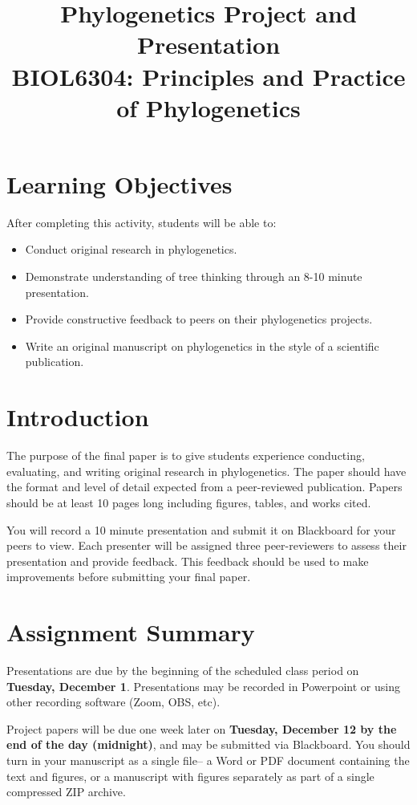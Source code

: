 \documentclass[12pt]{article}
\title{Phylogenetics Project and Presentation\\ \large BIOL6304: Principles and Practice of Phylogenetics }
\begin{document}
\maketitle

\section{Learning Objectives}

After completing this activity, students will be able to:

\begin{itemize}
\item Conduct original research in phylogenetics.
\item Demonstrate understanding of tree thinking through an 8-10 minute presentation.
\item Provide constructive feedback to peers on their phylogenetics projects.
\item Write an original manuscript on phylogenetics in the style of a scientific publication.
\end{itemize}

\section{Introduction}

The purpose of the final paper is to give students experience conducting, evaluating, and writing original research in phylogenetics.
The paper should have the format and level of detail expected from a peer-reviewed publication.
Papers should be at least 10 pages long including figures, tables, and works cited.

You will record a 10 minute presentation and submit it on Blackboard for your peers to view.
Each presenter will be assigned three peer-reviewers to assess their presentation and provide feedback.
This feedback should be used to make improvements before submitting your final paper.


\section{Assignment Summary}

Presentations are due by the beginning of the scheduled class period on \textbf{Tuesday, December 1}.
Presentations may be recorded in Powerpoint or using other recording software (Zoom, OBS, etc).

Project papers will be due one week later on \textbf{Tuesday, December 12 by the end of the day (midnight)}, and may be submitted via Blackboard.
You should turn in your manuscript as a single file-- a Word or PDF document containing the text and figures, or a manuscript with figures separately as part of a single compressed ZIP archive.
\end{document}
